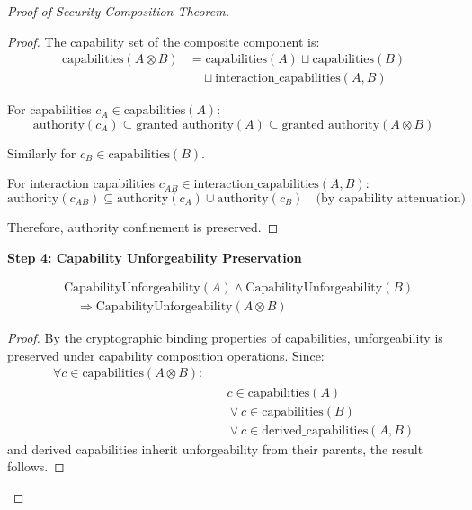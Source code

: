 \begin{proof}[Proof of Security Composition Theorem]
\begin{proof}
The capability set of the composite component is:
\begin{align}
\text{capabilities}(A \otimes B) &= \text{capabilities}(A) \sqcup \text{capabilities}(B) \nonumber \\
&\quad \sqcup \text{interaction\_capabilities}(A, B)
\end{align}

For capabilities $c_A \in \text{capabilities}(A)$:
\begin{equation}
\text{authority}(c_A) \subseteq \text{granted\_authority}(A) \subseteq \text{granted\_authority}(A \otimes B)
\end{equation}

Similarly for $c_B \in \text{capabilities}(B)$. 

For interaction capabilities $c_{AB} \in \text{interaction\_capabilities}(A, B)$:
\begin{equation}
\text{authority}(c_{AB}) \subseteq \text{authority}(c_A) \cup \text{authority}(c_B) \quad \text{(by capability attenuation)}
\end{equation}

Therefore, authority confinement is preserved.
\end{proof}

\textbf{Step 4: Capability Unforgeability Preservation}

\begin{lemma}
\begin{align}
&\text{CapabilityUnforgeability}(A) \land \text{CapabilityUnforgeability}(B) \nonumber \\
&\quad \Rightarrow \text{CapabilityUnforgeability}(A \otimes B)
\end{align}
\end{lemma}

\begin{proof}
By the cryptographic binding properties of capabilities, unforgeability is preserved under capability composition operations. Since:
\begin{align}
\forall c \in \text{capabilities}(A \otimes B): \nonumber \\
&\quad c \in \text{capabilities}(A) \nonumber \\
&\quad \lor c \in \text{capabilities}(B) \nonumber \\
&\quad \lor c \in \text{derived\_capabilities}(A, B)
\end{align}
and derived capabilities inherit unforgeability from their parents, the result follows.
\end{proof}


\end{proof}
